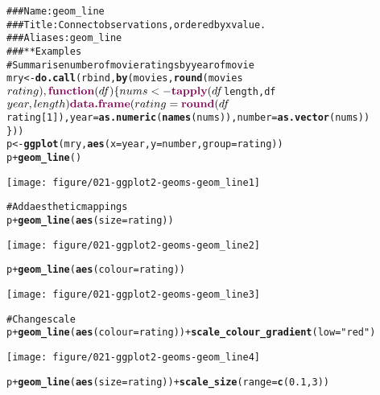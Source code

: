 \documentclass[a4paper,titlepage]{tufte-handout}\usepackage{graphicx, color}
\makeatletter
\def\maxwidth{ %
  \ifdim\Gin@nat@width>\linewidth
    \linewidth
  \else
    \Gin@nat@width
  \fi
}
\newcommand{\hlfunctioncall}[1]{\textcolor[rgb]{0.501960784313725,0,0.329411764705882}{\textbf{#1}}}%
\newcommand{\hlstring}[1]{\textcolor[rgb]{0.6,0.6,1}{#1}}%
\newcommand{\hlcomment}[1]{\textcolor[rgb]{0.180392156862745,0.6,0.341176470588235}{#1}}%
\newenvironment{kframe}{%
 \def\at@end@of@kframe{}%
 \ifinner\ifhmode%
  \def\at@end@of@kframe{\end{minipage}}%
  \begin{minipage}{\columnwidth}%
 \fi\fi%
 \def\FrameCommand##1{\hskip\@totalleftmargin \hskip-\fboxsep
 \colorbox{shadecolor}{##1}\hskip-\fboxsep
     \hskip-\linewidth \hskip-\@totalleftmargin \hskip\columnwidth}%
 \MakeFramed {\advance\hsize-\width
   \@totalleftmargin\z@ \linewidth\hsize
   \@setminipage}}%
 {\par\unskip\endMakeFramed%
 \at@end@of@kframe}
\newenvironment{knitrout}{}{} %
\makeatother
\begin{document}
\begin{knitrout}
\color{fgcolor}\begin{kframe}
\begin{alltt}
\hlcomment{### Name: geom_line}
\hlcomment{### Title: Connect observations, ordered by x value.}
\hlcomment{### Aliases: geom_line}
\hlcomment{### ** Examples}
\hlcomment{# Summarise number of movie ratings by year of movie}
mry <- \hlfunctioncall{do.call}(rbind, \hlfunctioncall{by}(movies, \hlfunctioncall{round}(movies$rating), \hlfunctioncall{function}(df) \{
  nums <- \hlfunctioncall{tapply}(df$length, df$year, length)
  \hlfunctioncall{data.frame}(rating=\hlfunctioncall{round}(df$rating[1]), year = \hlfunctioncall{as.numeric}(\hlfunctioncall{names}(nums)), number=\hlfunctioncall{as.vector}(nums))
\}))
p <- \hlfunctioncall{ggplot}(mry, \hlfunctioncall{aes}(x=year, y=number, group=rating))
p + \hlfunctioncall{geom_line}()
\end{alltt}
\end{kframe}\texttt{[image: figure/021-ggplot2-geoms-geom\_line1]} \begin{kframe}\begin{alltt}
\hlcomment{# Add aesthetic mappings}
p + \hlfunctioncall{geom_line}(\hlfunctioncall{aes}(size = rating))
\end{alltt}
\end{kframe}\texttt{[image: figure/021-ggplot2-geoms-geom\_line2]} \begin{kframe}\begin{alltt}
p + \hlfunctioncall{geom_line}(\hlfunctioncall{aes}(colour = rating))
\end{alltt}
\end{kframe}\texttt{[image: figure/021-ggplot2-geoms-geom\_line3]} \begin{kframe}\begin{alltt}
\hlcomment{# Change scale}
p + \hlfunctioncall{geom_line}(\hlfunctioncall{aes}(colour = rating)) + \hlfunctioncall{scale_colour_gradient}(low=\hlstring{"red"})
\end{alltt}
\end{kframe}\texttt{[image: figure/021-ggplot2-geoms-geom\_line4]} \begin{kframe}\begin{alltt}
p + \hlfunctioncall{geom_line}(\hlfunctioncall{aes}(size = rating)) + \hlfunctioncall{scale_size}(range = \hlfunctioncall{c}(0.1, 3))
\end{alltt}

\end{kframe}
\end{knitrout}
\end{document}
